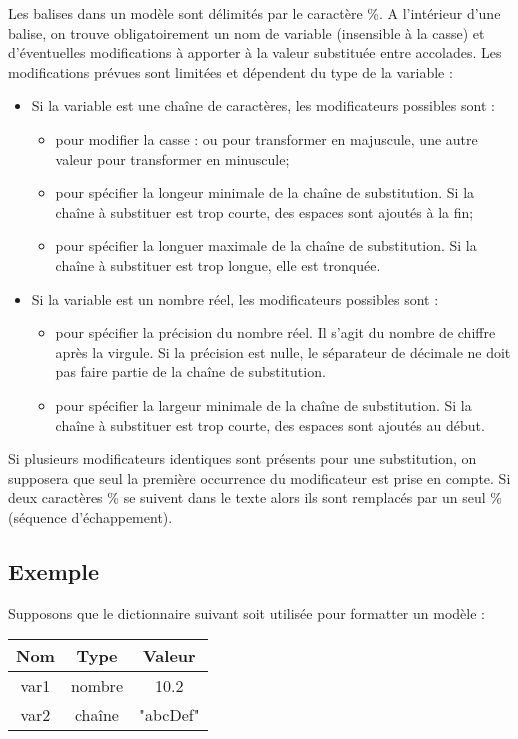 Les balises dans un modèle sont délimités par le caractère \%. A l'intérieur d'une balise, on trouve obligatoirement un nom de variable (insensible à la casse) et d'éventuelles modifications à apporter à la valeur substituée entre accolades. Les modifications prévues sont limitées et dépendent du type de la variable :
\begin{itemize}
  \item Si la variable est une chaîne de caractères, les modificateurs possibles sont :
  	\begin{itemize}
	  \item {} pour modifier la casse :  ou  pour transformer en majuscule, une autre valeur pour transformer en minuscule;
	  \item {} pour spécifier la longeur minimale de la chaîne de substitution. Si la chaîne à substituer est trop courte, des espaces sont ajoutés à la fin;
	  \item {} pour spécifier la longuer maximale de la chaîne de substitution. Si la chaîne à substituer est trop longue, elle est tronquée.
	\end{itemize}
  \item Si la variable est un nombre réel, les modificateurs possibles sont :
    \begin{itemize}
	  \item {} pour spécifier la précision du nombre réel. Il s'agit du nombre de chiffre après la virgule. Si la précision est nulle, le séparateur de décimale ne doit pas faire partie de la chaîne de substitution.
	  \item {} pour spécifier la largeur minimale de la chaîne de substitution. Si la chaîne à substituer est trop courte, des espaces sont ajoutés au début.
	\end{itemize}
\end{itemize}
Si plusieurs modificateurs identiques sont présents pour une substitution, on supposera que seul la première occurrence du modificateur est prise en compte. Si deux caractères \% se suivent dans le texte alors ils sont remplacés par un seul \% (séquence d'échappement).

\subsection{Exemple}

Supposons que le dictionnaire suivant soit utilisée pour formatter un modèle :
\begin{center}
\begin{tabular}{|c|c|c|}
\hline
Nom&Type&Valeur\\
\hline
var1&nombre&10.2\\
\hline
var2&chaîne&"abcDef"\\
\hline
\end{tabular}
\end{center}

